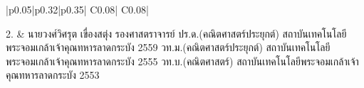 {\begin{center}
\begin{longtable}{|p{}|p{}|p{}|
	C{0.08\textwidth}|
	C{0.08\textwidth}|}

2. &
นายวงศ์วิศรุต เขื่องสตุ่ง \newline 
รองศาสตราจารย์	\newline
ปร.ด.(คณิตศาสตร์ประยุกต์) \newline สถาบันเทคโนโลยีพระจอมเกล้าเจ้าคุณทหารลาดกระบัง 2559 \newline
วท.ม.(คณิตศาสตร์ประยุกต์) \newline สถาบันเทคโนโลยีพระจอมเกล้าเจ้าคุณทหารลาดกระบัง 2555  \newline
วท.บ.(คณิตศาสตร์) \newline สถาบันเทคโนโลยีพระจอมเกล้าเจ้าคุณทหารลาดกระบัง 2553


\end{longtable}
\end{center}}
